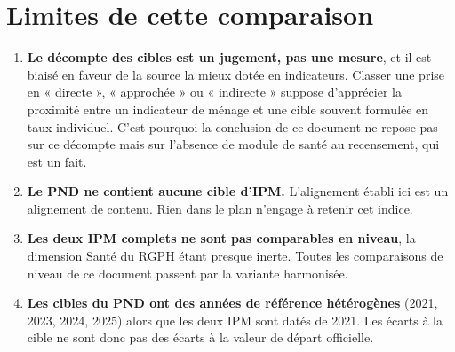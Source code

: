 \documentclass[11pt,a4paper]{article}
\begin{document}
\section{Limites de cette comparaison}

\begin{enumerate}
  \item \textbf{Le décompte des cibles est un jugement, pas une mesure}, et il est biaisé en faveur
        de la source la mieux dotée en indicateurs. Classer une prise en « directe », « approchée »
        ou « indirecte » suppose d'apprécier la proximité entre un indicateur de ménage et une cible
        souvent formulée en taux individuel. C'est pourquoi la conclusion de ce document ne repose
        pas sur ce décompte mais sur l'absence de module de santé au recensement, qui est un fait.
  \item \textbf{Le PND ne contient aucune cible d'IPM.} L'alignement établi ici est un alignement de
        contenu. Rien dans le plan n'engage à retenir cet indice.
  \item \textbf{Les deux IPM complets ne sont pas comparables en niveau}, la dimension Santé du
        RGPH étant presque inerte. Toutes les comparaisons de niveau de ce document passent par la
        variante harmonisée.
  \item \textbf{Les cibles du PND ont des années de référence hétérogènes} (2021, 2023, 2024, 2025)
        alors que les deux IPM sont datés de 2021. Les écarts à la cible ne sont donc pas des
        écarts à la valeur de départ officielle.
\end{enumerate}
\end{document}
